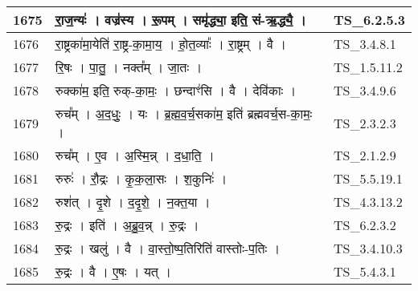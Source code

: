 \documentclass[17pt]{extarticle}
\begin{document}
\begin{longtable}{||p{0.4in}||p{4.9in}||p{0.9in}||}
    \hline
        
    1675 & रा॒ज॒न्यः॑   ।   वज्र॑स्य   ।   रू॒पम्   ।   समृ॑द्ध्या॒ इति॒ सं{-}ऋ॒द्ध्यै॒   ।    & TS\_6.2.5.3       \\
    
    \hline
        
    1676 & रा॒ष्ट्रका॑मा॒येति॑ रा॒ष्ट्र{-}का॒मा॒य॒   ।   हो॒त॒व्याः᳚   ।   रा॒ष्ट्रम्   ।   वै   ।    & TS\_3.4.8.1       \\
    
    \hline
        
    1677 & रि॒षः   ।   पा॒तु॒   ।   नक्त᳚म्   ।   जा॒तः   ।    & TS\_1.5.11.2       \\
    
    \hline
        
    1678 & रुक्का॑म॒ इति॒ रुक्{-}का॒मः॒   ।   छन्दाꣳ॑सि   ।   वै   ।   देवि॑काः   ।    & TS\_3.4.9.6       \\
    
    \hline
        
    1679 & रुच᳚म्   ।   अ॒द॒धुः॒   ।   यः   ।   ब्र॒ह्म॒व॒र्च॒सका॑म॒ इति॑ ब्रह्मवर्च॒स{-}का॒मः॒   ।    & TS\_2.3.2.3       \\
    
    \hline
        
    1680 & रुच᳚म्   ।   ए॒व   ।   अ॒स्मि॒न्न्   ।   द॒धा॒ति॒   ।    & TS\_2.1.2.9       \\
    
    \hline
        
    1681 & रुरुः॑   ।   रौ॒द्रः   ।   कृ॒क॒ला॒सः   ।   श॒कुनिः॑   ।    & TS\_5.5.19.1       \\
    
    \hline
        
    1682 & रुश॑त्   ।   दृ॒शे   ।   द॒दृ॒शे॒   ।   न॒क्त॒या   ।    & TS\_4.3.13.2       \\
    
    \hline
        
    1683 & रु॒द्रः   ।   इति॑   ।   अ॒ब्रु॒व॒न्न्   ।   रु॒द्रः   ।    & TS\_6.2.3.2       \\
    
    \hline
        
    1684 & रु॒द्रः   ।   खलु॑   ।   वै   ।   वा॒स्तो॒ष्प॒तिरिति॑ वास्तोः{-}प॒तिः   ।    & TS\_3.4.10.3       \\
    
    \hline
        
    1685 & रु॒द्रः   ।   वै   ।   ए॒षः   ।   यत्   ।    & TS\_5.4.3.1       \\
    

\end{longtable}
\end{document}
